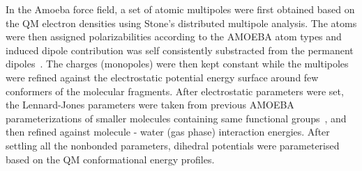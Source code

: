 \documentclass[journal=jacsat,manuscript=article,layout=singlecolumn]{achemso}
\begin{document}
In the Amoeba force field, a set of atomic multipoles were first obtained based on the QM electron densities using Stone's distributed multipole analysis. The atoms were then assigned polarizabilities according to the AMOEBA atom types and   induced dipole contribution was self consistently substracted from the permanent dipoles~\cite{shi2013proteinamoeba}. The charges (monopoles) were then kept constant while the multipoles were refined against the electrostatic potential energy surface around few conformers of the molecular fragments. %
After electrostatic parameters were set, the Lennard-Jones parameters were taken from previous AMOEBA parameterizations of smaller molecules containing same functional groups~\cite{Ren2011polorganic,shi2011hydration}, and then refined against molecule - water (gas phase) interaction energies. After settling all the nonbonded parameters, dihedral potentials were parameterised based on the QM conformational energy profiles.

\end{document}
